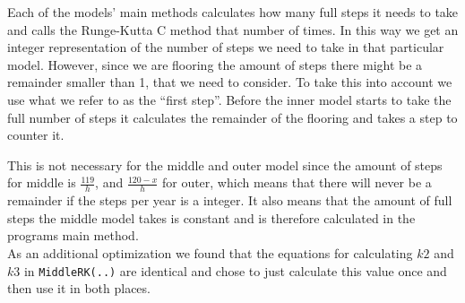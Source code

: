 Each of the models' main methods calculates how many full steps it needs to take and calls the Runge-Kutta C method that number of times. In this way we get an integer representation of the number of steps we need to take in that particular model. However, since we are flooring the amount of steps there might be a remainder smaller than 1, that we need to consider. To take this into account we use what we refer to as the ``first step''. Before the inner model starts to take the full number of steps it calculates the remainder of the flooring and takes a step to counter it.

This is not necessary for the middle and outer model since the amount of steps for middle is $\frac{119}{h}$, and $\frac{120-x}{h}$ for outer, which means that there will never be a remainder if the steps per year is a integer. It also means that the amount of full steps the middle model takes is constant and is therefore calculated in the programs main method. \\

As an additional optimization we found that the equations for calculating $k2$ and $k3$ in \texttt{MiddleRK(..)} are identical and chose to just calculate this value once and then use it in both places.
